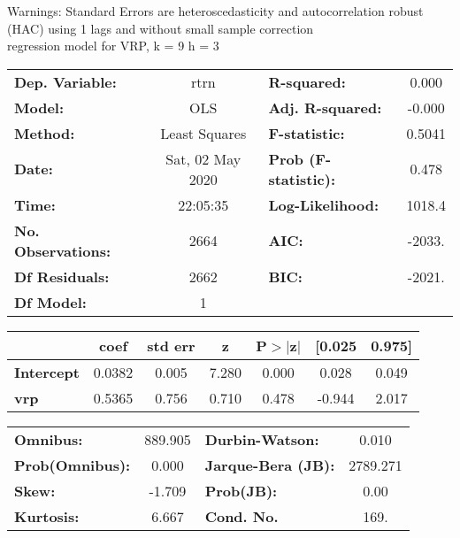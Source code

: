 Warnings: \newline
 [1] Standard Errors are heteroscedasticity and autocorrelation robust (HAC) using 1 lags and without small sample correction\\ 

regression model for VRP, k = 9 h = 3\begin{center}
\begin{tabular}{lclc}
\toprule
\textbf{Dep. Variable:}    &       rtrn       & \textbf{  R-squared:         } &     0.000   \\
\textbf{Model:}            &       OLS        & \textbf{  Adj. R-squared:    } &    -0.000   \\
\textbf{Method:}           &  Least Squares   & \textbf{  F-statistic:       } &    0.5041   \\
\textbf{Date:}             & Sat, 02 May 2020 & \textbf{  Prob (F-statistic):} &    0.478    \\
\textbf{Time:}             &     22:05:35     & \textbf{  Log-Likelihood:    } &    1018.4   \\
\textbf{No. Observations:} &        2664      & \textbf{  AIC:               } &    -2033.   \\
\textbf{Df Residuals:}     &        2662      & \textbf{  BIC:               } &    -2021.   \\
\textbf{Df Model:}         &           1      & \textbf{                     } &             \\
\bottomrule
\end{tabular}
\begin{tabular}{lcccccc}
                   & \textbf{coef} & \textbf{std err} & \textbf{z} & \textbf{P$> |$z$|$} & \textbf{[0.025} & \textbf{0.975]}  \\
\midrule
\textbf{Intercept} &       0.0382  &        0.005     &     7.280  &         0.000        &        0.028    &        0.049     \\
\textbf{vrp}       &       0.5365  &        0.756     &     0.710  &         0.478        &       -0.944    &        2.017     \\
\bottomrule
\end{tabular}
\begin{tabular}{lclc}
\textbf{Omnibus:}       & 889.905 & \textbf{  Durbin-Watson:     } &    0.010  \\
\textbf{Prob(Omnibus):} &   0.000 & \textbf{  Jarque-Bera (JB):  } & 2789.271  \\
\textbf{Skew:}          &  -1.709 & \textbf{  Prob(JB):          } &     0.00  \\
\textbf{Kurtosis:}      &   6.667 & \textbf{  Cond. No.          } &     169.  \\
\bottomrule
\end{tabular}
\end{center}

